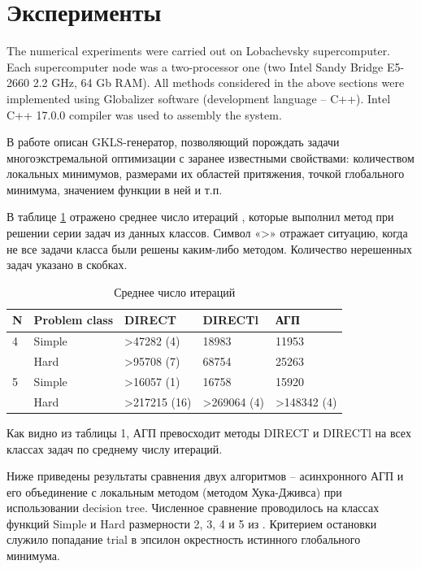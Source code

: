 \documentclass{svproc}
\begin{document}
\section{Эксперименты}

The numerical experiments were carried out on Lobachevsky supercomputer. Each supercomputer node was a two-processor one (two Intel Sandy Bridge E5-2660 2.2 GHz, 64 Gb RAM). All methods considered in the above sections were implemented using Globalizer software \cite{globalizerSystem} (development language – C++). Intel C++ 17.0.0 compiler was used to assembly the system.

В работе \cite{fio_bib13, fio_bib17} описан GKLS-генератор, позволяющий порождать задачи многоэкстремальной оптимизации с заранее известными свойствами: количеством локальных минимумов, размерами их областей притяжения, точкой глобального минимума, значением функции в ней и т.п.

В таблице \ref{tab:1} отражено среднее число итераций , которые выполнил метод при решении серии задач из данных классов. Символ «>» отражает ситуацию, когда не все задачи класса были решены каким-либо методом. Количество нерешенных задач указано в скобках.


\begin{table}[!ht]
    \caption{Среднее число итераций}
    \label{tab:1}
    \centering
    \begin{tabular}{|l|l|l|l|l|}
    \hline
        N & Problem class & DIRECT & DIRECTl & АГП  \\ \hline
        4 & Simple & >47282 (4) & 18983 & 11953  \\ \hline
        ~ & Hard & >95708 (7) & 68754 & 25263  \\ \hline
        5 & Simple & >16057 (1) & 16758 & 15920  \\ \hline
        ~ & Hard & >217215 (16) & >269064 (4) & >148342 (4)  \\ \hline
    \end{tabular}
\end{table}

Как видно из таблицы 1, АГП превосходит методы DIRECT и DIRECTl на всех классах задач по среднему числу итераций. 


Ниже приведены результаты сравнения двух алгоритмов – асинхронного АГП и его объединение с локальным методом (методом Хука-Дживса) при использовании decision tree. Численное сравнение проводилось на классах функций Simple и Hard размерности 2, 3, 4 и 5 из \cite{fio_bib19}. Критерием остановки служило попадание trial в эпсилон окрестность истинного глобального минимума. 
\end{document}
